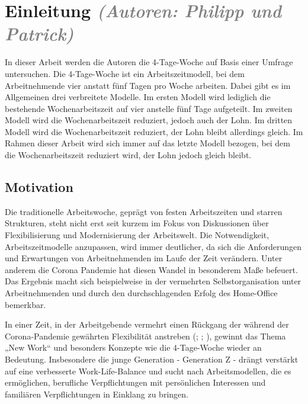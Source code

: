 \chapter{Einleitung \textit{\textcolor{gray}{(Autoren: Philipp und Patrick)}} }

In dieser Arbeit werden die Autoren die 4-Tage-Woche auf Basis einer Umfrage untersuchen. 
Die 4-Tage-Woche ist ein Arbeitszeitmodell, bei dem Arbeitnehmende vier anstatt fünf Tagen pro Woche arbeiten. 
Dabei gibt es im Allgemeinen drei verbreitete Modelle. Im ersten Modell wird lediglich die bestehende Wochenarbeitszeit auf vier anstelle fünf Tage aufgeteilt. 
Im zweiten Modell wird die Wochenarbeitszeit reduziert, jedoch auch der Lohn. Im dritten Modell wird die Wochenarbeitszeit reduziert, der Lohn bleibt allerdings gleich. \parencite[vgl.][]{habdank_deutscher_2024}
Im Rahmen dieser Arbeit wird sich immer auf das letzte Modell bezogen, bei dem die Wochenarbeitszeit reduziert wird, der Lohn jedoch gleich bleibt.

\section{Motivation}

Die traditionelle Arbeitswoche, geprägt von festen Arbeitszeiten und starren Strukturen, steht nicht erst seit kurzem im Fokus von 
Diskussionen über Flexibilisierung und Modernisierung der Arbeitswelt. Die Notwendigkeit, Arbeitszeitmodelle anzupassen, wird immer deutlicher, da sich 
die Anforderungen und Erwartungen von Arbeitnehmenden im Laufe der Zeit verändern. Unter anderem die Corona Pandemie hat diesen Wandel in 
besonderem Maße befeuert. Das Ergebnis macht sich beispielweise in der vermehrten Selbstorganisation unter Arbeitnehmenden und durch den 
durchschlagenden Erfolg des Home-Office bemerkbar. \parencite[vgl.][S. 73]{haide_arbeitswelt_2022}

In einer Zeit, in der Arbeitgebende vermehrt einen Rückgang der während der Corona-Pandemie gewährten Flexibilität anstreben (\cite{elias_googles_2023}; \cite{lee_apple_2022}; \cite{vanian_meta_2023}), 
gewinnt das Thema „New Work“ und besonders Konzepte wie die 4-Tage-Woche wieder an Bedeutung.
Insbesondere die junge Generation - Generation Z - drängt verstärkt auf eine verbesserte Work-Life-Balance und sucht nach Arbeitsmodellen, 
die es ermöglichen, berufliche Verpflichtungen mit persönlichen Interessen und familiären Verpflichtungen in Einklang zu bringen. \parencite[vgl.][S. 10]{onlyfy_wechselwilligkeitsstudie_2023}

